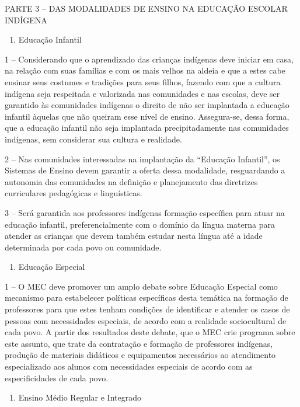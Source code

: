 \documentclass[
]{book}
\providecommand{\tightlist}{%
  \setlength{\itemsep}{0pt}\setlength{\parskip}{0pt}}
\begin{document}
PARTE 3 -- DAS MODALIDADES DE ENSINO NA EDUCAÇÃO ESCOLAR INDÍGENA

\begin{enumerate}
\def\labelenumi{\Alph{enumi})}
\tightlist
\item
  Educação Infantil
\end{enumerate}

1 -- Considerando que o aprendizado das crianças indígenas deve iniciar em casa, na relação com suas famílias e com os mais velhos na aldeia e que a estes cabe ensinar seus costumes e tradições para seus filhos, fazendo com que a cultura indígena seja respeitada e valorizada nas comunidades e nas escolas, deve ser garantido às comunidades indígenas o direito de não ser implantada a educação infantil àquelas que não queiram esse nível de ensino. Assegura-se, dessa forma, que a educação infantil não seja implantada precipitadamente nas comunidades indígenas, sem considerar sua cultura e realidade.

2 -- Nas comunidades interessadas na implantação da ``Educação Infantil'', os Sistemas de Ensino devem garantir a oferta dessa modalidade, resguardando a autonomia das comunidades na definição e planejamento das diretrizes curriculares pedagógicas e linguísticas.

3 -- Será garantida aos professores indígenas formação específica para atuar na educação infantil, preferencialmente com o domínio da língua materna para atender as crianças que devem também estudar nesta língua até a idade determinada por cada povo ou comunidade.

\begin{enumerate}
\def\labelenumi{\Alph{enumi})}
\setcounter{enumi}{1}
\tightlist
\item
  Educação Especial
\end{enumerate}

1 -- O MEC deve promover um amplo debate sobre Educação Especial como mecanismo para estabelecer políticas específicas desta temática na formação de professores para que estes tenham condições de identificar e atender os casos de pessoas com necessidades especiais, de acordo com a realidade sociocultural de cada povo. A partir dos resultados deste debate, que o MEC crie programa sobre este assunto, que trate da contratação e formação de professores indígenas, produção de materiais didáticos e equipamentos necessários ao atendimento especializado aos alunos com necessidades especiais de acordo com as especificidades de cada povo.

\begin{enumerate}
\def\labelenumi{\Alph{enumi})}
\setcounter{enumi}{2}
\tightlist
\item
  Ensino Médio Regular e Integrado
\end{enumerate}
\end{document}
